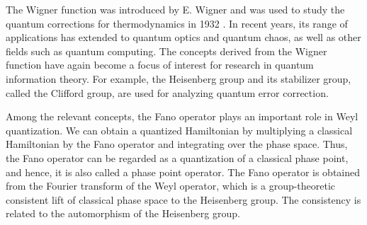 \documentclass[12pt]{iopart}
\begin{document}
The Wigner function was introduced by E. Wigner
and was used to study the quantum corrections for thermodynamics in 1932 \cite{Wigner}. 
%
In recent years, its range of applications has extended to
quantum optics and quantum chaos, as well as other fields such as quantum computing.
%
The concepts derived from the Wigner function have again become a focus of interest
for research in quantum information theory.
%
For example, the Heisenberg group and its stabilizer group, called the Clifford group, are used
for analyzing quantum error correction.

Among the relevant concepts, the Fano operator plays an important role in Weyl quantization.
We can obtain a quantized Hamiltonian by multiplying a classical Hamiltonian
by the Fano operator and integrating over the phase space.
%
Thus, the Fano operator can be regarded as a quantization
of a classical phase point, and hence, it is also called a phase point operator.
%
The Fano operator is obtained from the Fourier transform of the Weyl operator,
which is a group-theoretic consistent lift of classical phase space to the Heisenberg group.
The consistency is related to the automorphism of the Heisenberg group.
\end{document}
